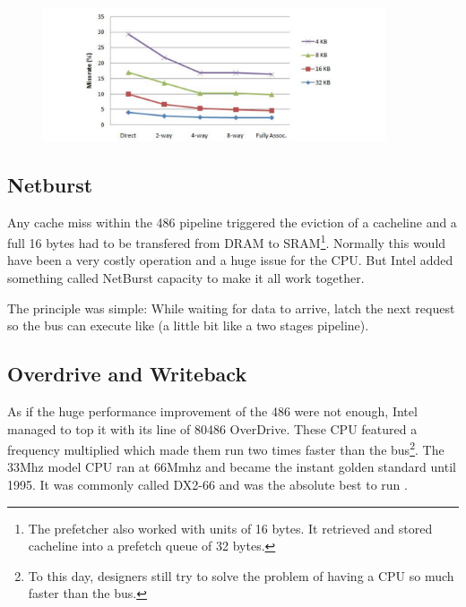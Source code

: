   \begin{figure}[H]
    \centering
    \includegraphics[width=0.9\textwidth]{drawings/set_cache_stats.png}
    \caption{}
  \end{figure}
  \par


\subsection{Netburst}
Any cache miss within the 486 pipeline triggered the eviction of a cacheline and a full 16 bytes had to be transfered from DRAM to SRAM\footnote{The prefetcher also worked with units of 16 bytes. It retrieved and stored cacheline into a prefetch queue of 32 bytes.}. Normally this would have been a very costly operation and a huge issue for the CPU. But Intel added something called NetBurst capacity to make it all work together.\\
\par
The principle was simple: While waiting for data to arrive, latch the next request so the bus can execute like (a little bit like a two stages pipeline).\\
\par
{}







\subsection{Overdrive and Writeback}
As if the huge performance improvement of the 486 were not enough, Intel managed to top it with its line of 80486 OverDrive. These CPU featured a frequency multiplied which made them run two times faster than the bus\footnote{To this day, designers still try to solve the problem of having a CPU so much faster than the bus.}. The 33Mhz model CPU ran at 66Mmhz and became the instant golden standard until 1995. It was commonly called DX2-66 and was the absolute best to run \doom.\\
\par 
{}%
\par

